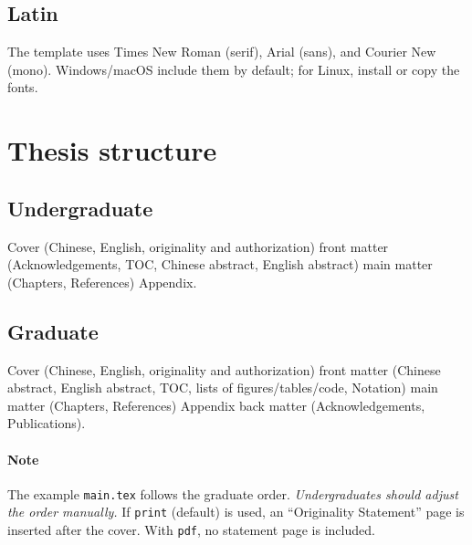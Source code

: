 \documentclass[12pt]{article}
\begin{document}
\subsection*{Latin}
The template uses Times New Roman (serif), Arial (sans), and Courier New (mono). Windows/macOS include them by default; for Linux, install or copy the fonts.

\section{Thesis structure}
\subsection*{Undergraduate}
Cover (Chinese, English, originality and authorization) \textrightarrow{} front matter (Acknowledgements, TOC, Chinese abstract, English abstract) \textrightarrow{} main matter (Chapters, References) \textrightarrow{} Appendix.

\subsection*{Graduate}
Cover (Chinese, English, originality and authorization) \textrightarrow{} front matter (Chinese abstract, English abstract, TOC, lists of figures/tables/code, Notation) \textrightarrow{} main matter (Chapters, References) \textrightarrow{} Appendix \textrightarrow{} back matter (Acknowledgements, Publications).

\paragraph{Note} The example \texttt{main.tex} follows the graduate order. \emph{Undergraduates should adjust the order manually.} If \texttt{print} (default) is used, an “Originality Statement” page is inserted after the cover. With \texttt{pdf}, no statement page is included.
\end{document}
